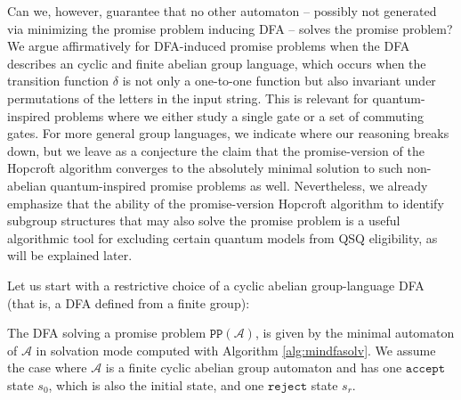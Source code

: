 \documentclass[../main.tex]{subfiles}
\begin{document}
Can we, however, guarantee that no other automaton -- possibly not generated via minimizing the promise problem inducing \ac{DFA} -- solves the promise problem? We argue affirmatively for DFA-induced promise problems when the DFA describes an cyclic and finite abelian group language, which occurs when the transition function $\delta$ is not only a one-to-one function but also invariant under permutations of the letters in the input string. This is relevant for quantum-inspired problems where we either study a single gate or a set of commuting gates. For more general group languages, we indicate where our reasoning breaks down, but we leave as a conjecture the claim that the promise-version of the Hopcroft algorithm converges to the absolutely minimal solution to such non-abelian quantum-inspired promise problems as well. Nevertheless, we already emphasize that the ability of the promise-version Hopcroft algorithm to identify subgroup structures that may also solve the promise problem is a useful algorithmic tool for excluding certain quantum models from QSQ eligibility, as will be explained later.

Let us start with a restrictive choice of a cyclic abelian group-language DFA (that is, a DFA defined from a finite group):
\begin{proposition}\label{prop:minsolvation}
    The DFA solving a promise problem $\mathtt{PP}(\mathcal{A})$, is given by the minimal automaton of $\mathcal{A}$ in solvation mode computed with Algorithm \ref{alg:mindfasolv}. We assume the case where $\mathcal{A}$ is a finite cyclic abelian group automaton and has one $\mathtt{accept}$ state $s_0$, which is also the initial state, and one $\mathtt{reject}$  state $s_r$.
\end{proposition}
\end{document}
